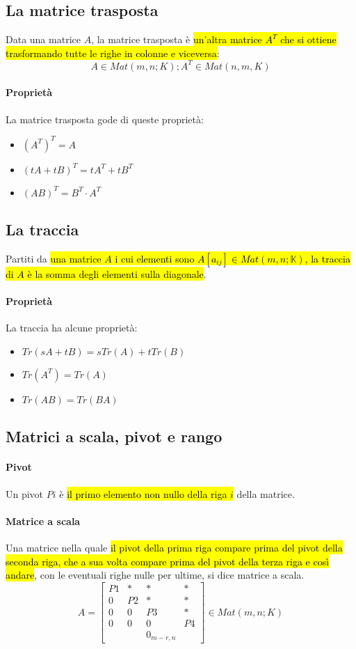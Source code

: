 \subsection{La matrice trasposta}
Data una matrice $A$, la matrice trasposta è \hl{un'altra matrice $A^T$ che si
ottiene trasformando tutte le righe in colonne e viceversa}:
\[
    A \in Mat(m,n;K); A^T \in Mat(n,m,K)
\]

\paragraph{Proprietà} La matrice trasposta gode di queste proprietà:
\begin{itemize}
    \item $(A^T)^T = A$
    \item $(tA + tB)^T = tA^T + tB^T$
    \item $(AB)^T = B^T \cdot A^T$
\end{itemize}

\subsection{La traccia}
Partiti da \hl{una matrice $A$ i cui elementi sono $A[a_{ij}] \in Mat(m,n;\mathbb{K})$,
la traccia di $A$ è la somma degli elementi sulla diagonale}.

\paragraph{Proprietà} La traccia ha alcune proprietà:
\begin{itemize}
    \item $Tr(sA + tB) = sTr(A) + tTr(B)$
    \item $Tr(A^T) = Tr(A)$
    \item $Tr(AB) = Tr(BA)$
\end{itemize}

\subsection{Matrici a scala, pivot e rango}
\paragraph{Pivot} Un pivot $Pi$ è \hl{il primo elemento non nullo della riga $i$}
della matrice.

\paragraph{Matrice a scala} Una matrice nella quale \hl{il pivot della prima riga
compare prima del pivot della seconda riga, che a sua volta compare prima del
pivot della terza riga e così andare}, con le eventuali righe nulle per ultime, si
dice matrice a scala.
\[
    A =
    \begin{bmatrix}
        P1 & *  & *  & * \\
        0  & P2 & *  & * \\
        0  & 0  & P3 & * \\
        0  & 0  & 0  & P4 \\
        & & 0_{m-r, n} &
    \end{bmatrix} \in Mat(m,n;K)
\]

